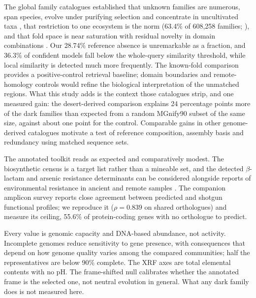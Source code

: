 \documentclass[11pt]{article}
\begin{document}
The global family catalogues established that unknown families are numerous, span species, evolve
under purifying selection and concentrate in uncultivated taxa
\citep{rodriguezdelrio2024fesnov,pavlopoulos2023darkmatter,vanni2022agnostos}, that restriction to
one ecosystem is the norm (63.4\% of 608{,}258 families; \citealp{aplakidou2025quadrupling}), and
that fold space is near saturation with residual novelty in domain combinations
\citep{lau2024ted,yeo2025afesm}. Our 28.74\% reference absence is unremarkable as a fraction, and
36.3\% of confident models fall below the whole-query similarity threshold, while local
similarity is detected much more frequently. The known-fold comparison provides a positive-control
retrieval baseline; domain boundaries and remote-homology controls would refine the biological
interpretation of the unmatched regions. What this study adds is the context those catalogues
strip, and one measured gain: the desert-derived comparison explains 24 percentage points more of the dark families
than expected from a random MGnify90 subset of the same size, against about one point for the
control. Comparable gains in other genome-derived catalogues motivate a test of reference
composition, assembly basis and redundancy using matched sequence sets.

The annotated toolkit reads as expected and comparatively modest.
The biosynthetic census is a target list rather than a mineable set, and the detected $\beta$-lactam and arsenic resistance determinants can be considered alongside
reports of environmental resistance in ancient and remote samples \citep{dcosta2011ancient,vangoethem2018antarctic}. The companion amplicon survey
reports close agreement between predicted and shotgun functional profiles; we reproduce it
($\rho = 0.839$ on shared orthologues) and measure its ceiling, 55.6\% of protein-coding genes with
no orthologue to predict.

Every value is genomic capacity and DNA-based abundance, not activity. Incomplete genomes
reduce sensitivity to gene presence, with consequences that depend on how genome quality varies
among the compared communities; half the representatives
are below 90\% complete. The XRF axes are total elemental contents with no pH. The frame-shifted null
calibrates whether the annotated frame is the selected one, not neutral evolution in general. What
any dark family does is not measured here.
\end{document}
